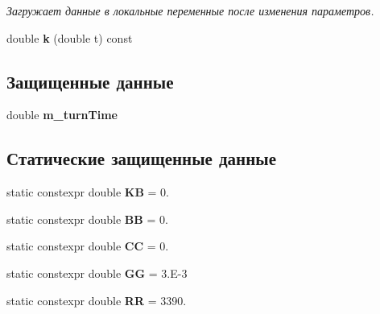\begin{DoxyCompactItemize}
\begin{DoxyCompactList}\small\item\em Загружает данные в локальные переменные после изменения параметров. \end{DoxyCompactList}\item 
double {\bfseries k} (double t) const \hypertarget{class_tasks_1_1_discrete_1_1_landing_linear_a60889421ceaa2b74f43fcfd3dcfd91ba}{}\label{class_tasks_1_1_discrete_1_1_landing_linear_a60889421ceaa2b74f43fcfd3dcfd91ba}

\end{DoxyCompactItemize}
\subsection*{Защищенные данные}
\begin{DoxyCompactItemize}
\item 
double {\bfseries m\+\_\+turn\+Time}\hypertarget{class_tasks_1_1_discrete_1_1_landing_linear_a95cd1d6b8774484348cf21842bc1ab82}{}\label{class_tasks_1_1_discrete_1_1_landing_linear_a95cd1d6b8774484348cf21842bc1ab82}

\end{DoxyCompactItemize}
\subsection*{Статические защищенные данные}
\begin{DoxyCompactItemize}
\item 
static constexpr double {\bfseries KB} = 0.\hypertarget{class_tasks_1_1_discrete_1_1_landing_linear_ab62185db94c68bc2ea5449b455b71ca9}{}\label{class_tasks_1_1_discrete_1_1_landing_linear_ab62185db94c68bc2ea5449b455b71ca9}

\item 
static constexpr double {\bfseries BB} = 0.\hypertarget{class_tasks_1_1_discrete_1_1_landing_linear_a27e46b3c8f6359b7fe37205fe6d4b009}{}\label{class_tasks_1_1_discrete_1_1_landing_linear_a27e46b3c8f6359b7fe37205fe6d4b009}

\item 
static constexpr double {\bfseries CC} = 0.\hypertarget{class_tasks_1_1_discrete_1_1_landing_linear_ae2d5423e0cc942b236f97b55d16070b2}{}\label{class_tasks_1_1_discrete_1_1_landing_linear_ae2d5423e0cc942b236f97b55d16070b2}

\item 
static constexpr double {\bfseries GG} = 3.\+E-\/3\hypertarget{class_tasks_1_1_discrete_1_1_landing_linear_a54a6e7e6668dae1ba3e700f633031b34}{}\label{class_tasks_1_1_discrete_1_1_landing_linear_a54a6e7e6668dae1ba3e700f633031b34}

\item 
static constexpr double {\bfseries RR} = 3390.\hypertarget{class_tasks_1_1_discrete_1_1_landing_linear_a5de434a509158bf23cb5fba7445b2e2d}{}\label{class_tasks_1_1_discrete_1_1_landing_linear_a5de434a509158bf23cb5fba7445b2e2d}

\end{DoxyCompactItemize}


